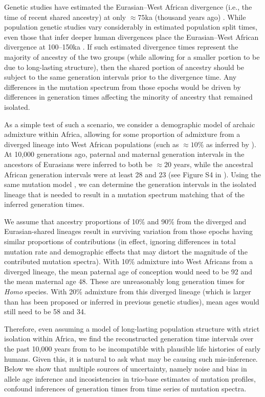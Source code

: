 \documentclass[]{article}
\begin{document}
Genetic studies have estimated the Eurasian--West African divergence (i.e., the
time of recent shared ancestry) at only $\approx 75$ka (thousand years ago)
\citep[e.g.,][]{pagani2015tracing,bergstrom2020insights}. While population
genetic studies vary considerably in estimated population split times, even
those that infer deeper human divergences place the Eurasian--West African
divergence at 100--150ka \citep[e.g.,][]{schlebusch2017southern}. If such
estimated divergence times represent the majority of ancestry of the two groups
(while allowing for a smaller portion to be due to long-lasting structure),
then the shared portion of ancestry should be subject to the same generation
intervals prior to the divergence time. Any differences in the mutation
spectrum from those epochs would be driven by differences in generation times
affecting the minority of ancestry that remained isolated. 

As a simple test of such a scenario, we consider a demographic model of archaic
admixture within Africa, allowing for some proportion of admixture from a
diverged lineage into West African populations (such as $\approx10\%$ as
inferred by \citet{durvasula2020recovering}). At 10,000 generations ago,
paternal and maternal generation intervals in the ancestors of Eurasians were
inferred to both be $\approx20$ years, while the ancestral African generation
intervals were at least 28 and 23 (see Figure S4 in \citet{wang2023human}).
Using the same mutation model \citep{jonsson2017parental}, we can determine the
generation intervals in the isolated lineage that is needed to result in a
mutation spectrum matching that of the inferred generation times.

We assume that ancestry proportions of 10\% and 90\% from the diverged and
Eurasian-shared lineages result in surviving variation from those epochs having
similar proportions of contributions (in effect, ignoring differences in total
    mutation rate and demographic effects that may distort the magnitude of the
contributed mutation spectra). With 10\% admixture into West Africans from a
diverged lineage, the mean paternal age of conception would need to be 92 and
the mean maternal age 48. These are unreasonably long generation times for
\emph{Homo} species. With 20\% admixture from this diverged lineage (which is
larger than has been proposed or inferred in previous genetic studies), mean
ages would still need to be 58 and 34.

Therefore, even assuming a model of long-lasting population structure with
strict isolation within Africa, we find the reconstructed generation time
intervals over the past 10,000 years from \citet{wang2023human} to be
incompatible with plausible life histories of early humans. Given this, it is
natural to ask what may be causing such mis-inference. Below we show that
multiple sources of uncertainty, namely noise and bias in allele age inference
and incosistencies in trio-base estimates of mutation profiles, confound
inferences of generation times from time series of mutation spectra.
\end{document}
